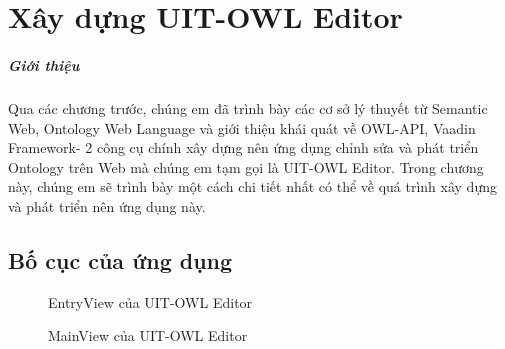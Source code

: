 \chapter{Xây dựng UIT-OWL Editor}
\paragraph{Giới thiệu} Qua các chương trước, chúng em đã trình bày các cơ sở lý thuyết từ Semantic Web, Ontology Web Language và giới thiệu khái quát về OWL-API, Vaadin Framework- 2 công cụ chính xây dựng nên ứng dụng chỉnh sửa và phát triển Ontology trên Web mà chúng em tạm gọi là UIT-OWL Editor. Trong chương này, chúng em sẽ trình bày một cách chi tiết nhất có thể về quá trình xây dựng và phát triển nên ứng dụng này.
\section{Bố cục của ứng dụng}
\begin{figure}[h!]
	\centering
	\caption{EntryView của UIT-OWL Editor\label{overflow}}
\end{figure}
\begin{figure}[h!]
	\centering
	\caption{MainView của UIT-OWL Editor\label{overflow}}
\end{figure}
